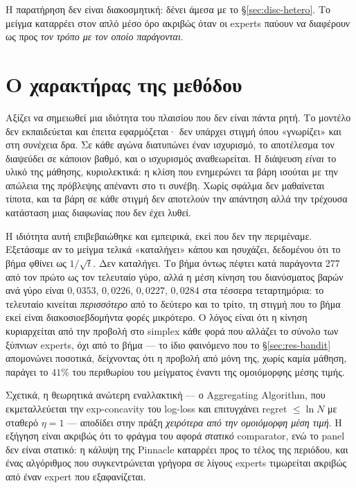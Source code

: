 \documentclass[12pt,a4paper,oneside]{report}
\renewcommand{\_}{\oldunderscore\allowbreak}
\theoremstyle{definition}
\theoremstyle{plain}
\theoremstyle{remark}
\begin{document}
Η παρατήρηση δεν είναι διακοσμητική: δένει άμεσα με το \S\ref{sec:disc-hetero}. Το μείγμα
καταρρέει στον απλό μέσο όρο ακριβώς όταν οι experts παύουν να διαφέρουν ως προς \emph{τον
τρόπο με τον οποίο παράγονται}.

\section{Ο χαρακτήρας της μεθόδου}

Αξίζει να σημειωθεί μια ιδιότητα του πλαισίου που δεν είναι πάντα ρητή. Το μοντέλο δεν
εκπαιδεύεται και έπειτα εφαρμόζεται· δεν υπάρχει στιγμή όπου «γνωρίζει» και στη συνέχεια
δρα. Σε κάθε αγώνα διατυπώνει έναν ισχυρισμό, το αποτέλεσμα τον διαψεύδει σε κάποιον βαθμό,
και ο ισχυρισμός αναθεωρείται. Η διάψευση \emph{είναι} το υλικό της μάθησης, κυριολεκτικά: η
κλίση που ενημερώνει τα βάρη ισούται με την απώλεια της πρόβλεψης απέναντι στο τι συνέβη.
Χωρίς σφάλμα δεν μαθαίνεται τίποτα, και τα βάρη σε κάθε στιγμή δεν αποτελούν την απάντηση
αλλά την τρέχουσα κατάσταση μιας διαφωνίας που δεν έχει λυθεί.

Η ιδιότητα αυτή επιβεβαιώθηκε και εμπειρικά, εκεί που δεν την περιμέναμε. Εξετάσαμε αν το
μείγμα τελικά «καταλήγει» κάπου και ησυχάζει, δεδομένου ότι το βήμα φθίνει ως
$1/\sqrt{t}$. Δεν καταλήγει. Το βήμα όντως πέφτει κατά παράγοντα 277 από τον πρώτο ως τον
τελευταίο γύρο, αλλά η μέση κίνηση του διανύσματος βαρών ανά γύρο είναι $0{,}0353$,
$0{,}0226$, $0{,}0227$, $0{,}0284$ στα τέσσερα τεταρτημόρια: το τελευταίο κινείται
\emph{περισσότερο} από το δεύτερο και το τρίτο, τη στιγμή που το βήμα εκεί είναι
διακοσιοεβδομήντα φορές μικρότερο. Ο λόγος είναι ότι η κίνηση κυριαρχείται από την προβολή
στο simplex κάθε φορά που αλλάζει το σύνολο των ξύπνιων experts, όχι από το βήμα ---
το ίδιο φαινόμενο που το \S\ref{sec:res-bandit} απομονώνει ποσοτικά, δείχνοντας ότι η
προβολή από μόνη της, χωρίς καμία μάθηση, παράγει το $41\%$ του περιθωρίου του μείγματος
έναντι της ομοιόμορφης μέσης τιμής.

Σχετικά, η θεωρητικά ανώτερη εναλλακτική --- ο Aggregating Algorithm, που εκμεταλλεύεται την
exp-concavity του log-loss και επιτυγχάνει regret $\leq \ln N$ με σταθερό $\eta=1$ ---
αποδίδει στην πράξη \emph{χειρότερα από την ομοιόμορφη μέση τιμή}. Η εξήγηση είναι ακριβώς
ότι το φράγμα του αφορά \emph{στατικό} comparator, ενώ το panel δεν είναι στατικό: η κάλυψη
της Pinnacle καταρρέει προς το τέλος της περιόδου, και ένας αλγόριθμος που συγκεντρώνεται
γρήγορα σε λίγους experts τιμωρείται ακριβώς από έναν expert που εξαφανίζεται.
\end{document}
